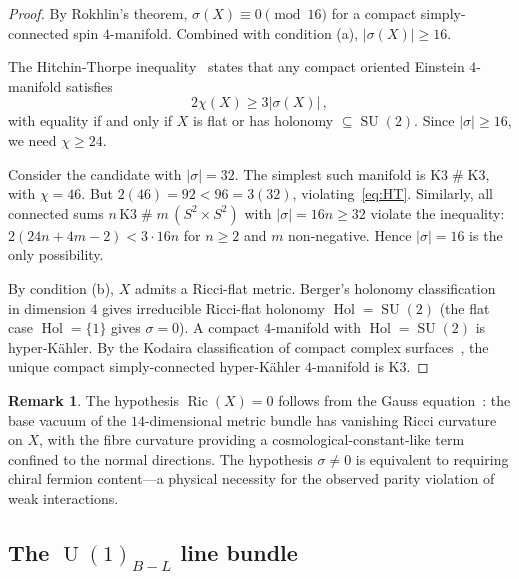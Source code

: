 \documentclass[12pt,a4paper]{article}
\theoremstyle{definition}
\newtheorem{remark}[theorem]{Remark}
\newcommand{\SU}{\operatorname{SU}}
\newcommand{\U}{\operatorname{U}}
\begin{document}
\begin{proof}
By Rokhlin's theorem, $\sigma(X) \equiv 0 \pmod{16}$ for a compact simply-connected spin $4$-manifold.
Combined with condition (a), $|\sigma(X)| \geq 16$.

The Hitchin-Thorpe inequality~\cite{Hitchin1974,Thorpe1969} states that any compact oriented Einstein $4$-manifold satisfies
\begin{equation}
\label{eq:HT}
2\chi(X) \geq 3|\sigma(X)|\,,
\end{equation}
with equality if and only if $X$ is flat or has holonomy $\subseteq \SU(2)$.
Since $|\sigma| \geq 16$, we need $\chi \geq 24$.

Consider the candidate with $|\sigma| = 32$.
The simplest such manifold is $\mathrm{K3} \mathbin{\#} \mathrm{K3}$, with $\chi = 46$.
But $2(46) = 92 < 96 = 3(32)$, violating~\eqref{eq:HT}.
Similarly, all connected sums $n\, \mathrm{K3} \mathbin{\#} m\, (S^2 \times S^2)$ with $|\sigma| = 16n \geq 32$ violate the inequality: $2(24n + 4m - 2) < 3 \cdot 16n$ for $n \geq 2$ and $m$ non-negative.
Hence $|\sigma| = 16$ is the only possibility.

By condition (b), $X$ admits a Ricci-flat metric.
Berger's holonomy classification~\cite{Berger1955} in dimension $4$ gives irreducible Ricci-flat holonomy $\operatorname{Hol} = \SU(2)$ (the flat case $\operatorname{Hol} = \{1\}$ gives $\sigma = 0$).
A compact $4$-manifold with $\operatorname{Hol} = \SU(2)$ is hyper-K\"ahler.
By the Kodaira classification of compact complex surfaces~\cite{Kodaira1964}, the unique compact simply-connected hyper-K\"ahler $4$-manifold is K3.
\end{proof}

\begin{remark}
The hypothesis $\operatorname{Ric}(X) = 0$ follows from the Gauss equation~\cite{Paper3}: the base vacuum of the $14$-dimensional metric bundle has vanishing Ricci curvature on $X$, with the fibre curvature providing a cosmological-constant-like term confined to the normal directions.
The hypothesis $\sigma \neq 0$ is equivalent to requiring chiral fermion content---a physical necessity for the observed parity violation of weak interactions.
\end{remark}

\subsection{The \texorpdfstring{$\U(1)_{B-L}$}{U(1)B-L} line bundle}
\end{document}
